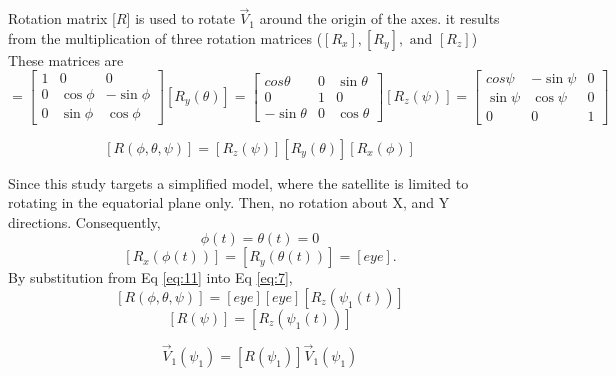 \documentclass[11pt]{article}
\begin{document}
Rotation matrix [$R$] is used to rotate $\vec{V}_{1}$ around the origin of the axes. it results from the multiplication of three rotation matrices ($[R_x], [R_y], \text{ and } [R_z]$) These matrices are 
\begin{equation}
[R_x(\phi)] = \begin{bmatrix}
            1 &0 & 0 \\
            0 & \cos{\phi}& -\sin{\phi} \\
            0 & \sin{\phi}&\cos{\phi}
            \end{bmatrix}
[R_y(\theta)] = \begin{bmatrix}
            cos{\theta} &0 & \sin{\theta} \\
            0 & 1& 0 \\
            -\sin{\theta}&0 & \cos{\theta}
            \end{bmatrix}
[R_z(\psi)] = \begin{bmatrix}
            cos{\psi}  &  -\sin{\psi}  &  0    \\
            \sin{\psi}&   \cos{\psi}    & 0\\
            0          &    0   & 1          
            \end{bmatrix}        
\end{equation}

\begin{equation}\label{eq:11}
[R(\phi, \theta, \psi)]= [R_z(\psi)][R_y(\theta)][R_x(\phi)]
\end{equation}


Since this study targets a simplified model, where the satellite is limited to rotating in the equatorial plane only. Then, no rotation about X, and Y directions. 
Consequently,
\begin{equation}\label{fig:6}
    \phi(t) = \theta(t) = 0 
    \end{equation}
\begin{equation}\label{eq:7}
    [R_x(\phi(t))]=[R_y(\theta(t))]=[eye] .
\end{equation}
By substitution from Eq \ref{eq:11} into Eq \ref{eq:7},
\begin{equation}\label{eq:04}
    [R(\phi, \theta, \psi)] = [eye] [ eye] [R_z(\psi_1(t))]
\end{equation}
\begin{equation}\label{eq:04}
    [R(\psi)] = [R_z(\psi_1(t))]
\end{equation}

\begin{equation}\label{eq:05}
    \vec{V}_1(\psi_1) = [R(\psi_1)] \vec{V}_1(\psi_1)  
\end{equation}
\end{document}
